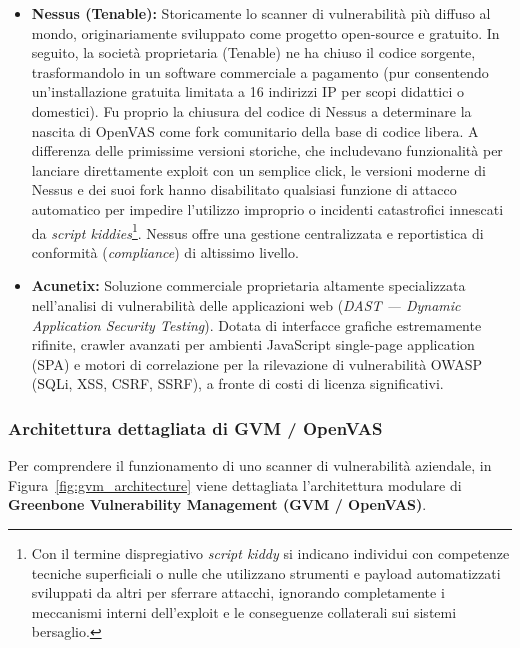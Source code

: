 \documentclass[../../main.tex]{subfiles}
\begin{document}
\begin{itemize}
    \item \textbf{Nessus (Tenable):} Storicamente lo scanner di vulnerabilità più diffuso al mondo, originariamente sviluppato come progetto open-source e gratuito. In seguito, la società proprietaria (Tenable) ne ha chiuso il codice sorgente, trasformandolo in un software commerciale a pagamento (pur consentendo un'installazione gratuita limitata a 16 indirizzi IP per scopi didattici o domestici). Fu proprio la chiusura del codice di Nessus a determinare la nascita di OpenVAS come fork comunitario della base di codice libera. A differenza delle primissime versioni storiche, che includevano funzionalità per lanciare direttamente exploit con un semplice click, le versioni moderne di Nessus e dei suoi fork hanno disabilitato qualsiasi funzione di attacco automatico per impedire l'utilizzo improprio o incidenti catastrofici innescati da \textit{script kiddies}\footnote{Con il termine dispregiativo \textit{script kiddy} si indicano individui con competenze tecniche superficiali o nulle che utilizzano strumenti e payload automatizzati sviluppati da altri per sferrare attacchi, ignorando completamente i meccanismi interni dell'exploit e le conseguenze collaterali sui sistemi bersaglio.}. Nessus offre una gestione centralizzata e reportistica di conformità (\textit{compliance}) di altissimo livello.
    
    \item \textbf{Acunetix:} Soluzione commerciale proprietaria altamente specializzata nell'analisi di vulnerabilità delle applicazioni web (\textit{DAST --- Dynamic Application Security Testing}). Dotata di interfacce grafiche estremamente rifinite, crawler avanzati per ambienti JavaScript single-page application (SPA) e motori di correlazione per la rilevazione di vulnerabilità OWASP (SQLi, XSS, CSRF, SSRF), a fronte di costi di licenza significativi.
\end{itemize}

\subsubsection{Architettura dettagliata di GVM / OpenVAS}
Per comprendere il funzionamento di uno scanner di vulnerabilità aziendale, in Figura~\ref{fig:gvm_architecture} viene dettagliata l'architettura modulare di \textbf{Greenbone Vulnerability Management (GVM / OpenVAS)}.
\end{document}
